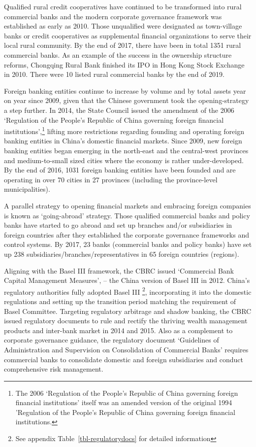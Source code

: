 \documentclass[
  letterpaper,
  DIV=11,
  numbers=noendperiod]{scrreprt}
\begin{document}
Qualified rural credit cooperatives have continued to be transformed
into rural commercial banks and the modern corporate governance
framework was established as early as 2010. Those unqualified were
designated as town-village banks or credit cooperatives as supplemental
financial organizations to serve their local rural community. By the end
of 2017, there have been in total 1351 rural commercial banks. As an
example of the success in the ownership structure reforms, Chongqing
Rural Bank finished its IPO in Hong Kong Stock Exchange in 2010. There
were 10 listed rural commercial banks by the end of 2019.

Foreign banking entities continue to increase by volume and by total
assets year on year since 2009, given that the Chinese government took
the opening-strategy a step further. In 2014, the State Council issued
the amendment of the 2006 `Regulation of the People's Republic of China
governing foreign financial institutions',\footnote{The 2006 `Regulation
  of the People's Republic of China governing foreign financial
  institutions' itself was an amended version of the original 1994
  'Regulation of the People's Republic of China governing foreign
  financial institutions.} lifting more restrictions regarding founding
and operating foreign banking entities in China's domestic financial
markets. Since 2009, new foreign banking entities began emerging in the
north-east and the central-west provinces and medium-to-small sized
cities where the economy is rather under-developed. By the end of 2016,
1031 foreign banking entities have been founded and are operating in
over 70 cities in 27 provinces (including the province-level
municipalities).

A parallel strategy to opening financial markets and embracing foreign
companies is known as `going-abroad' strategy. Those qualified
commercial banks and policy banks have started to go abroad and set up
branches and/or subsidiaries in foreign countries after they established
the corporate governance frameworks and control systems. By 2017, 23
banks (commercial banks and policy banks) have set up 238
subsidiaries/branches/representatives in 65 foreign countries (regions).

Aligning with the Basel III framework, the CBRC issued `Commercial Bank
Capital Management Measures', -- the China version of Basel III in 2012.
China's regulatory authorities fully adopted Basel III \footnote{See
  appendix Table~\ref{tbl-regulatorydocs} for detailed information},
incorporating it into the domestic regulations and setting up the
transition period matching the requirement of Basel Committee. Targeting
regulatory arbitrage and shadow banking, the CBRC issued regulatory
documents to rule and rectify the thriving wealth management products
and inter-bank market in 2014 and 2015. Also as a complement to
corporate governance guidance, the regulatory document `Guidelines of
Administration and Supervision on Consolidation of Commercial Banks'
requires commercial banks to consolidate domestic and foreign
subsidiaries and conduct comprehensive risk management.
\end{document}
